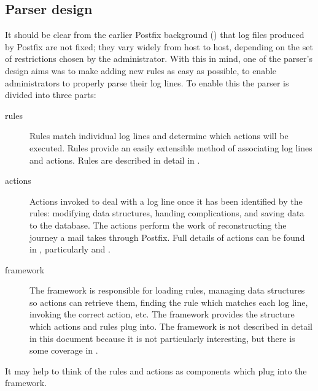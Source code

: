 \subsection{Parser design}

\label{parser design}

It should be clear from the earlier Postfix background () that log files produced by Postfix are not fixed; they vary
widely from host to host, depending on the set of restrictions chosen by
the administrator.  With this in mind, one of the parser's design aims was
to make adding new rules as easy as possible, to enable administrators to
properly parse their log lines.  To enable this the parser is divided into
three parts:

\begin{description}

    \item [rules] Rules match individual log lines and determine which
        actions will be executed.  Rules provide an easily extensible
        method of associating log lines and actions.  Rules are described
        in detail in .

    \item [actions] Actions invoked to deal with a log line once it has
        been identified by the rules: modifying data structures, handing
        complications, and saving data to the database.  The actions
        perform the work of reconstructing the journey a mail takes through
        Postfix.  Full details of actions can be found in
        , particularly
         and .

    \item [framework] The framework is responsible for loading rules,
        managing data structures so actions can retrieve them, finding the
        rule which matches each log line, invoking the correct action, etc.
        The framework provides the structure which actions and rules plug
        into.  The framework is not described in detail in this document
        because it is not particularly interesting, but there is some
        coverage in .

\end{description}

It may help to think of the rules and actions as components which plug into
the framework.  

\label{why separate rules, actions and framework?}

